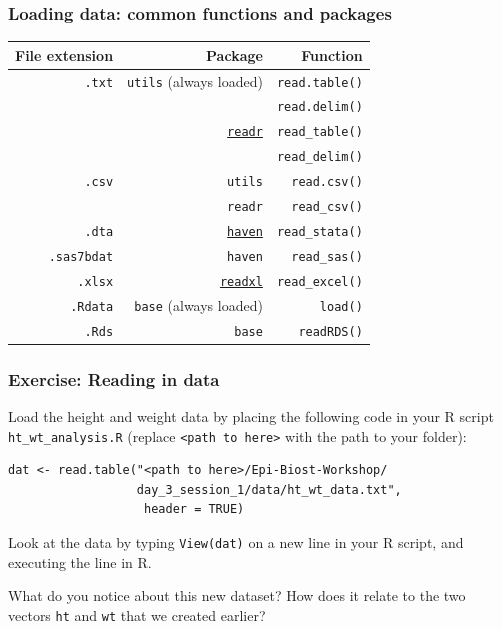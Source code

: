 \documentclass[11pt,dvipsnames]{beamer}
\newcommand{\myframe}[1]{\begin{frame} \frametitle{#1}}
\begin{document}
\myframe{Loading data: common functions and packages}
\begin{tabular}{rrr}
File extension & Package & Function \\
\hline 
\texttt{.txt} & \texttt{utils} (always loaded)  & \texttt{read.table()} \\
              &                & \texttt{read.delim()} \\
              & \href{http://readr.tidyverse.org/}{\texttt{readr}} & \texttt{read\_table()} \\
              &                & \texttt{read\_delim()} \\
\texttt{.csv} & \texttt{utils}  & \texttt{read.csv()} \\
              & \texttt{readr} & \texttt{read\_csv()} \\
\texttt{.dta} & \href{http://haven.tidyverse.org/}{\texttt{haven}} & \texttt{read\_stata()} \\
\texttt{.sas7bdat} & \texttt{haven} & \texttt{read\_sas()} \\
\texttt{.xlsx} & \href{http://readxl.tidyverse.org/}{\texttt{readxl}} & \texttt{read\_excel()} \\
\texttt{.Rdata} & \texttt{base} (always loaded) & \texttt{load()} \\
\texttt{.Rds} & \texttt{base} & \texttt{readRDS()} \\
\hline
\end{tabular}
\end{frame}

\begin{frame}[fragile]
\frametitle{Exercise: Reading in data}

Load the height and weight data by placing the following code in your R script \texttt{ht\_wt\_analysis.R} (replace \texttt{<path to here>} with the path to your folder):

{\small
\begin{verbatim}
dat <- read.table("<path to here>/Epi-Biost-Workshop/
                  day_3_session_1/data/ht_wt_data.txt",
                   header = TRUE)
\end{verbatim}
}

Look at the data by typing \texttt{View(dat)} on a new line in your R script, and executing the line in R. 

What do you notice about this new dataset? How does it relate to the two vectors \texttt{ht} and \texttt{wt} that we created earlier?
\end{frame}
\end{document}
